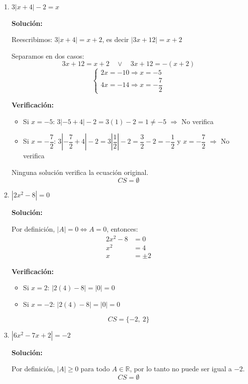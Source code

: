 \documentclass[12pt]{article}
\newcommand{\solucion}{%
    \vspace{0.8em}%
    \textbf{Solución:}%
}
\begin{document}
\begin{enumerate}[label=\alph*.-]
    \[
    \boxed{CS = \left\{-\dfrac{1}{2}\right\}}
    \]

    \item $3|x + 4| - 2 = x$

    \solucion

    Reescribimos: $3|x + 4| = x + 2$, es decir $|3x + 12| = x + 2$

    Separamos en dos casos:
    \[
    3x + 12 = x + 2 \quad \lor \quad 3x + 12 = -(x + 2)
    \]
    \[
    \begin{cases}
    2x = -10 \Rightarrow x = -5 \\[0.5em]
    4x = -14 \Rightarrow x = -\dfrac{7}{2}
    \end{cases}
    \]

    \textbf{Verificación:}
    \begin{itemize}
        \item Si $x = -5$: $3|-5 + 4| - 2 = 3(1) - 2 = 1 \neq -5$ \quad $\Rightarrow$ No verifica
        \item Si $x = -\dfrac{7}{2}$: $3\left|-\dfrac{7}{2} + 4\right| - 2 = 3\left|\dfrac{1}{2}\right| - 2 = \dfrac{3}{2} - 2 = -\dfrac{1}{2}$
        \quad y \quad $x = -\dfrac{7}{2}$ \quad $\Rightarrow$ No verifica
    \end{itemize}

    Ninguna solución verifica la ecuación original.
    \[
    \boxed{CS = \emptyset}
    \]

    \item $|2x^2 - 8| = 0$

    \solucion

    Por definición, $|A| = 0 \Leftrightarrow A = 0$, entonces:
    \begin{align*}
    2x^2 - 8 &= 0 \\[0.3em]
    x^2 &= 4 \\[0.3em]
    x &= \pm 2
    \end{align*}

    \textbf{Verificación:}
    \begin{itemize}
        \item Si $x = 2$: $|2(4) - 8| = |0| = 0$ \checkmark
        \item Si $x = -2$: $|2(4) - 8| = |0| = 0$ \checkmark
    \end{itemize}

    \[
    \boxed{CS = \{-2,\ 2\}}
    \]

    \newpage
    \item $|6x^2 - 7x + 2| = -2$

    \solucion

    Por definición, $|A| \geq 0$ para todo $A \in \mathbb{R}$, por lo tanto no puede ser igual a $-2$.
    \[
    \boxed{CS = \emptyset}
    \]

\end{enumerate}
\end{document}
